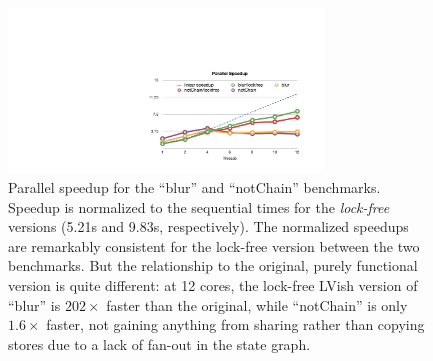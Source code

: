 

\begin{figure}  

\begin{center}
  \includegraphics[width=3.3in]{chapter4/figures/CFA_speedups.pdf}
\end{center}
  \caption{Parallel speedup for the ``blur'' and ``notChain'' benchmarks.
    Speedup is normalized to the sequential times for the {\em lock-free}
    versions (5.21s and 9.83s, respectively).  
%
    The normalized speedups are remarkably consistent for the lock-free version
    between the two benchmarks.  But the relationship to the original, purely
    functional version is quite different: at 12 cores, the lock-free LVish
    version of ``blur'' is $202\times$ faster than the original, while ``notChain'' is only
    $1.6\times$ faster, 
    not gaining anything from sharing rather than copying stores
    due to a lack of fan-out in the state graph.
}
  \label{fig:bench}
\end{figure}




